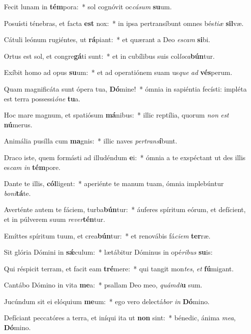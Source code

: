 \item Fecit lunam in \textbf{tém}pora:~* sol cognóvit oc\textit{cá}\textit{sum} \textbf{su}um.
\item Posuísti ténebras, et facta \textbf{est} nox:~* in ipsa pertransíbunt omnes bés\textit{ti}\textit{æ} \textbf{sil}væ.
\item Cátuli leónum rugiéntes, ut \textbf{rá}piant:~* et quærant a Deo \textit{es}\textit{cam} \textbf{si}bi.
\item Ortus est sol, et congre\textbf{gá}ti sunt:~* et in cubílibus suis col\textit{lo}\textit{ca}\textbf{bún}tur.
\item Exíbit homo ad opus \textbf{su}um:~* et ad operatiónem suam us\textit{que} \textit{ad} \textbf{vés}perum.
\item Quam magnificáta sunt ópera tua, \textbf{Dó}mine!~* ómnia in sapiéntia fecísti: impléta est terra possessi\textit{ó}\textit{ne} \textbf{tu}a.
\item Hoc mare magnum, et spatiósum \textbf{má}nibus:~* illic reptília, quorum \textit{non} \textit{est} \textbf{nú}merus.
\item Animália pusílla cum \textbf{ma}gnis:~* illic naves \textit{per}\textit{trans}\textbf{í}bunt.
\item Draco iste, quem formásti ad illudéndum \textbf{e}i:~* ómnia a te exspéctant ut des illis es\textit{cam} \textit{in} \textbf{tém}pore.
\item Dante te illis, \textbf{cól}ligent:~* aperiénte te manum tuam, ómnia implebúntur \textit{bo}\textit{ni}\textbf{tá}te.
\item Averténte autem te fáciem, turba\textbf{bún}tur:~* áuferes spíritum eórum, et defícient, et in púlverem suum \textit{re}\textit{ver}\textbf{tén}tur.
\item Emíttes spíritum tuum, et crea\textbf{bún}tur:~* et renovábis fá\textit{ci}\textit{em} \textbf{ter}ræ.
\item Sit glória Dómini in \textbf{sǽ}culum:~* lætábitur Dóminus in opé\textit{ri}\textit{bus} \textbf{su}is:
\item Qui réspicit terram, et facit eam \textbf{tré}mere:~* qui tangit mon\textit{tes}, \textit{et} \textbf{fú}migant.
\item Cantábo Dómino in vita \textbf{me}a:~* psallam Deo meo, \textit{quám}\textit{di}\textbf{u} sum.
\item Jucúndum sit ei elóquium \textbf{me}um:~* ego vero delectá\textit{bor} \textit{in} \textbf{Dó}mino.
\item Defíciant peccatóres a terra, et iníqui ita ut \textbf{non} sint:~* bénedic, ánima \textit{me}\textit{a}, \textbf{Dó}mino.
